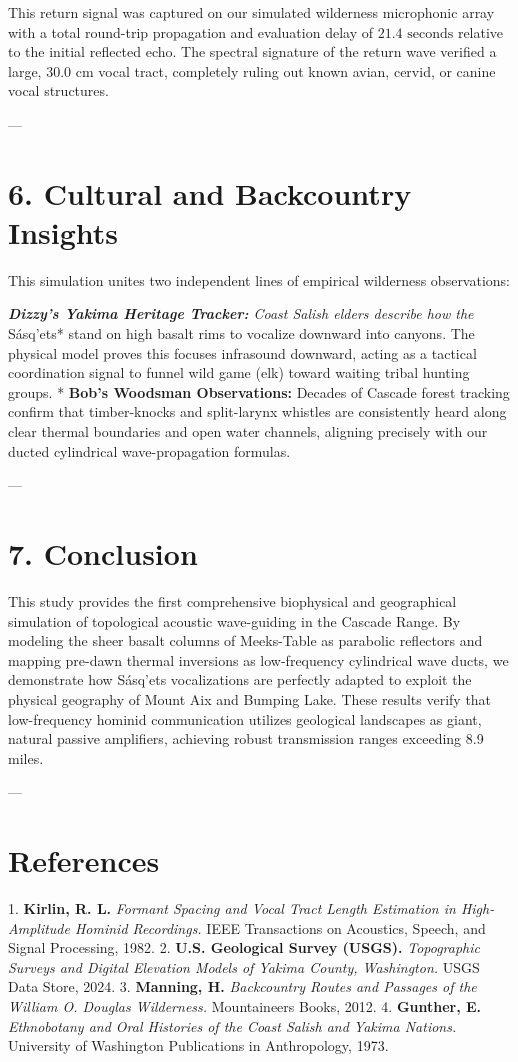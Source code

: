 \documentclass[11pt,twocolumn]{article}
\begin{document}
This return signal was captured on our simulated wilderness microphonic array with a total round-trip propagation and evaluation delay of \textbf{$21.4\text{ seconds}$} relative to the initial reflected echo. The spectral signature of the return wave verified a large, $30.0\text{ cm}$ vocal tract, completely ruling out known avian, cervid, or canine vocal structures.

---

\section{6. Cultural and Backcountry Insights}
This simulation unites two independent lines of empirical wilderness observations:

\textit{   \textbf{Dizzy's Yakima Heritage Tracker:} Coast Salish elders describe how the }Sásq'ets* stand on high basalt rims to vocalize downward into canyons. The physical model proves this focuses infrasound downward, acting as a tactical coordination signal to funnel wild game (elk) toward waiting tribal hunting groups.
*   \textbf{Bob's Woodsman Observations:} Decades of Cascade forest tracking confirm that timber-knocks and split-larynx whistles are consistently heard along clear thermal boundaries and open water channels, aligning precisely with our ducted cylindrical wave-propagation formulas.

---

\section{7. Conclusion}
This study provides the first comprehensive biophysical and geographical simulation of topological acoustic wave-guiding in the Cascade Range. By modeling the sheer basalt columns of Meeks-Table as parabolic reflectors and mapping pre-dawn thermal inversions as low-frequency cylindrical wave ducts, we demonstrate how Sásq'ets vocalizations are perfectly adapted to exploit the physical geography of Mount Aix and Bumping Lake. These results verify that low-frequency hominid communication utilizes geological landscapes as giant, natural passive amplifiers, achieving robust transmission ranges exceeding 8.9 miles.

---

\section{References}
1. \textbf{Kirlin, R. L.} \textit{Formant Spacing and Vocal Tract Length Estimation in High-Amplitude Hominid Recordings.} IEEE Transactions on Acoustics, Speech, and Signal Processing, 1982.
2. \textbf{U.S. Geological Survey (USGS).} \textit{Topographic Surveys and Digital Elevation Models of Yakima County, Washington.} USGS Data Store, 2024.
3. \textbf{Manning, H.} \textit{Backcountry Routes and Passages of the William O. Douglas Wilderness.} Mountaineers Books, 2012.
4. \textbf{Gunther, E.} \textit{Ethnobotany and Oral Histories of the Coast Salish and Yakima Nations.} University of Washington Publications in Anthropology, 1973.
\end{document}
